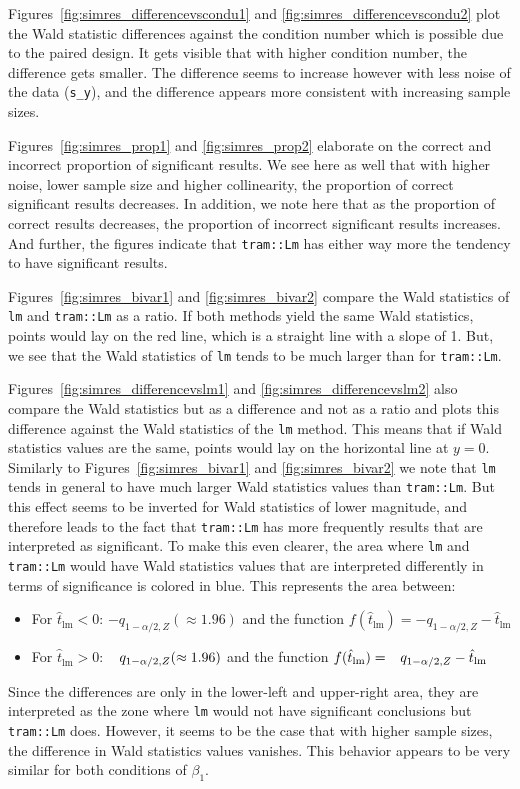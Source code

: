 \documentclass[11pt,a4paper,twoside]{book}\usepackage[]{graphicx}\usepackage[]{xcolor}
\begin{document}
Figures~\ref{fig:simres_differencevscondu1} and \ref{fig:simres_differencevscondu2} plot the Wald statistic differences against the condition number which is possible due to the paired design.
It gets visible that with higher condition number, the difference gets smaller.
The difference seems to increase however with less noise of the data (\texttt{s\_y}), and the difference appears more consistent with increasing sample sizes.

Figures~\ref{fig:simres_prop1} and \ref{fig:simres_prop2} elaborate on the correct and incorrect proportion of significant results. We see here as well that with higher noise, lower sample size and higher collinearity, the proportion of correct significant results decreases. In addition, we note here that as the proportion of correct results decreases, the proportion of incorrect significant results increases.
And further, the figures indicate that \texttt{tram::Lm} has either way more the tendency to have significant results.

Figures~\ref{fig:simres_bivar1} and \ref{fig:simres_bivar2} compare the Wald statistics of \texttt{lm} and \texttt{tram::Lm} as a ratio. 
If both methods yield the same Wald statistics, points would lay on the red line, which is a straight line with a slope of 1.
But, we see that the Wald statistics of \texttt{lm} tends to be much larger than for \texttt{tram::Lm}.

Figures~\ref{fig:simres_differencevslm1} and \ref{fig:simres_differencevslm2} also compare the Wald statistics but as a difference and not as a ratio and plots this difference against the Wald statistics of the \texttt{lm} method.
This means that if Wald statistics values are the same, points would lay on the horizontal line at $y=0$.
Similarly to Figures~\ref{fig:simres_bivar1} and \ref{fig:simres_bivar2} we note that \texttt{lm} tends in general to have much larger Wald statistics values than \texttt{tram::Lm}.
But this effect seems to be inverted for Wald statistics of lower magnitude, and therefore leads to the fact that \texttt{tram::Lm} has more frequently results that are interpreted as significant.
To make this even clearer, the area where \texttt{lm} and  \texttt{tram::Lm} would have Wald statistics values that are interpreted differently in terms of significance is colored in blue. This represents the area between:
\begin{itemize}
\item For $\hat{t}_\text{lm}<0$: $-q_{1-\alpha/2,Z}(\approx 1.96)$ and the function $f(\hat{t}_\text{lm})=-q_{1-\alpha/2,Z} -\hat{t}_\text{lm}$
\item For $\hat{t}_\text{lm}>0$: $\textcolor{white}{-}q_{1-\alpha/2,Z}(\approx 1.96)$ and the function $f(\hat{t}_\text{lm})=\textcolor{white}{-}q_{1-\alpha/2,Z} -\hat{t}_\text{lm}$
\end{itemize}
Since the differences are only in the lower-left and upper-right area, they are interpreted as the zone where \texttt{lm} would not have significant conclusions but \texttt{tram::Lm} does.
However, it seems to be the case that with higher sample sizes, the difference in Wald statistics values vanishes. This behavior appears to be very similar for both conditions of $\beta_1$.
\end{document}
